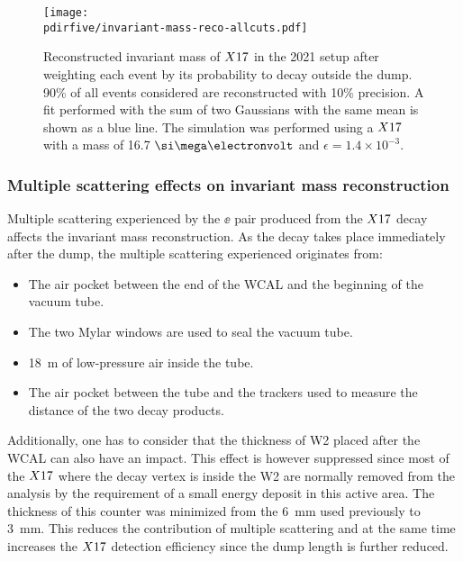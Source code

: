 \begin{figure}[tbh!]
  \centering
  \texttt{[image: \\pdirfive/invariant-mass-reco-allcuts.pdf]}
  \caption[Invariant mass reconstruction in 2021 setup]{Reconstructed invariant mass of $X17$ in the 2021 setup after weighting each event by its probability to decay outside the dump. 90\% of all events considered are reconstructed with 10\% precision. A fit performed with the sum of two Gaussians with the same mean is shown as a blue line. The simulation was performed using a $X17$ with a mass of 16.7 $\mev$ and $\epsilon = 1.4\times10^{-3}$.}
    \label{fig:imassreco}
  \end{figure}

\subsubsection{Multiple scattering effects on invariant mass reconstruction}
\label{ch5:sec:mm-scattering}

Multiple scattering experienced by the $\ee$ pair produced from the $X17$ decay affects the invariant mass reconstruction. As the decay takes place immediately after the dump, the multiple scattering experienced originates from:

\begin{itemize}
\item The air pocket between the end of the WCAL and the beginning of the vacuum tube.
\item The two Mylar windows are used to seal the vacuum tube.
\item \SI{18}{\meter} of low-pressure air inside the tube.
\item The air pocket between the tube and the trackers used to measure the distance of the two decay products.
\end{itemize}

Additionally, one has to consider that the thickness of W2 placed after the WCAL can also have an impact. This effect is however suppressed since most of the $X17$ where the decay vertex is inside the W2 are normally removed from the analysis by the requirement of a small energy deposit in this active area. The thickness of this counter was minimized from the \SI{6}{\milli\meter} used previously to \SI{3}{\milli\meter}. This reduces the contribution of multiple scattering and at the same time increases the $X17$ detection efficiency since the dump length is further reduced.

